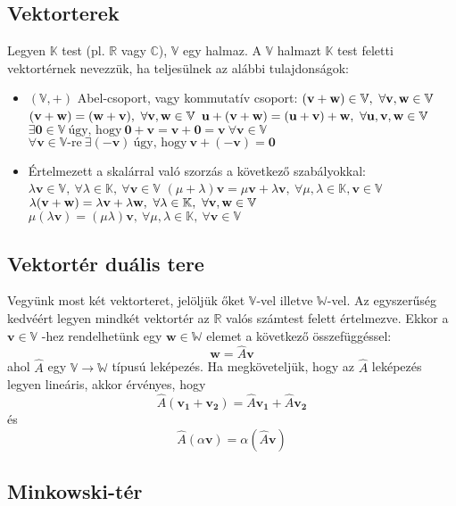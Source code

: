 \subsection{Vektorterek}
Legyen $\mathbb{K}$ test (pl. $\mathbb{R}$ vagy $\mathbb{C}$), $\mathbb{V}$ egy halmaz. A $\mathbb{V}$ halmazt $\mathbb{K}$ test feletti
vektortérnek nevezzük, ha teljesülnek az alábbi tulajdonságok:
\begin{itemize}
\item $(\mathbb{V}, +)$ Abel-csoport, vagy kommutatív csoport:
\subitem $(\mathbf{v} + \mathbf{w}) \in \mathbb{V}, ~ \forall \mathbf{v}, \mathbf{w} \in \mathbb{V}$
\subitem $(\mathbf{v} + \mathbf{w}) = (\mathbf{w} + \mathbf{v}), ~ \forall \mathbf{v}, \mathbf{w} \in \mathbb{V}$
\subitem $\mathbf{u} + (\mathbf{v} + \mathbf{w}) =(\mathbf{u} + \mathbf{v}) + \mathbf{w}, ~ \forall \mathbf{u},\mathbf{v}, \mathbf{w} \in \mathbb{V}$
\subitem $\exists \mathbf{0} \in \mathbb{V} ~ \textrm{úgy, hogy} ~ \mathbf{0} + \mathbf{v} = \mathbf{v} + \mathbf{0} = \mathbf{v} ~ \forall \mathbf{v}\in\mathbb{V}$
\subitem $ \forall \mathbf{v}\in\mathbb{V}\textrm{-re} ~ \exists (-\mathbf{v}) ~ \textrm{úgy, hogy} ~  \mathbf{v}+(-\mathbf{v})=\mathbf{0}$

\item Értelmezett a skalárral való szorzás a következő szabályokkal:
\subitem $\lambda \mathbf{v} \in \mathbb V, ~ \forall \lambda \in \mathbb{K}, ~ \forall \mathbf{v} \in \mathbb{V}$
\subitem $(\mu + \lambda) \mathbf{v} = \mu \mathbf{v} + \lambda\mathbf{v} , ~ \forall \mu, \lambda \in \mathbb{K}, \mathbf{v} \in \mathbb{V}$
\subitem $\lambda (\mathbf{v} + \mathbf{w}) = \lambda \mathbf{v} + \lambda \mathbf{w}, ~ \forall \lambda \in \mathbb{K}, ~ \forall \mathbf{v}, \mathbf{w} \in \mathbb{V}$
\subitem $\mu (\lambda \mathbf{v}) = (\mu \lambda)\mathbf{v} , ~ \forall \mu, \lambda \in \mathbb{K},~ \forall \mathbf{v} \in \mathbb{V}$

\end{itemize}

\subsection{Vektortér duális tere}
Vegyünk most két vektorteret, jelöljük őket $\mathbb{V}$-vel illetve $\mathbb{W}$-vel. Az egyszerűség kedvéért
legyen mindkét vektortér az $\mathbb{R}$ valós számtest felett értelmezve. Ekkor a $\mathbf{v} \in \mathbb{V}$ -hez rendelhetünk
egy $\mathbf{w} \in \mathbb{W}$ elemet a következő összefüggéssel:
\[ \mathbf{w} = \hat{A}\mathbf{v} \]
ahol $\hat{A}$ egy $\mathbb{V} \rightarrow \mathbb{W}$ típusú leképezés.
Ha megköveteljük, hogy az $\hat{A}$ leképezés legyen lineáris, akkor érvényes, hogy
\[ \hat{A}(\mathbf{v_1} + \mathbf{v_2}) = \hat{A}\mathbf{v_1} + \hat{A}\mathbf{v_2} \]
és
\[ \hat{A}(\alpha\mathbf{v}) = \alpha(\hat{A}\mathbf{v}) \]
\subsection{Minkowski-tér}
